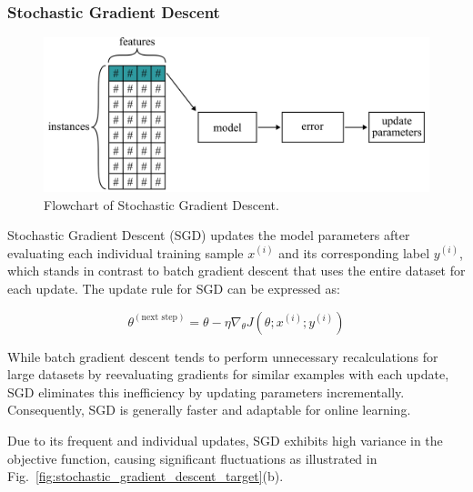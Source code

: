 \documentclass[12pt,letter]{article}
\begin{document}
\subsubsection{Stochastic Gradient Descent}


\begin{figure}[H]
	\centering
	\includegraphics[width=5.4in]{../figures/gradient_descent_stochastic}
	\caption{Flowchart of Stochastic Gradient Descent.}
	\label{fig:gradient_descent_stochastic}
\end{figure}
Stochastic Gradient Descent (SGD) updates the model parameters after evaluating each individual training sample $x^{(i)}$ and its corresponding label $y^{(i)}$, which stands in contrast to batch gradient descent that uses the entire dataset for each update. The update rule for SGD can be expressed as:

\begin{equation}
\theta^{(\text{next step})} = \theta - \eta \nabla_\theta J(\theta; x^{(i)}; y^{(i)})
\end{equation}

While batch gradient descent tends to perform unnecessary recalculations for large datasets by reevaluating gradients for similar examples with each update, SGD eliminates this inefficiency by updating parameters incrementally. Consequently, SGD is generally faster and adaptable for online learning.

Due to its frequent and individual updates, SGD exhibits high variance in the objective function, causing significant fluctuations as illustrated in Fig.~\ref{fig:stochastic_gradient_descent_target}(b).
\end{document}

